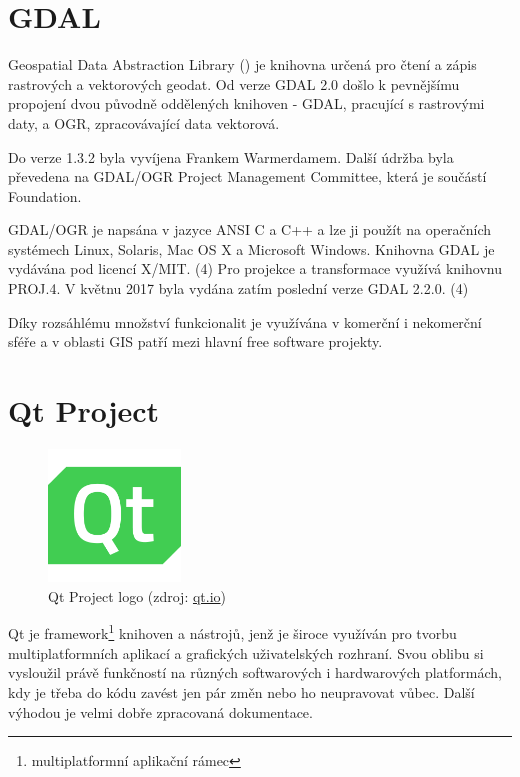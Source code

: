   
\section{GDAL}  

Geospatial Data Abstraction Library () je knihovna určená pro čtení a zápis rastrových a vektorových geodat. Od verze GDAL 2.0 došlo k pevnějšímu propojení dvou původně oddělených knihoven - GDAL, pracující s rastrovými daty, a OGR, zpracovávající data vektorová.

Do verze 1.3.2 byla vyvíjena Frankem Warmerdamem. Další údržba byla převedena na GDAL/OGR Project Management Committee, která je součástí  Foundation. 

GDAL/OGR je napsána v jazyce ANSI C a C++ a lze ji použít na operačních systémech Linux, Solaris, Mac OS X a Microsoft Windows. Knihovna GDAL je vydávána pod licencí X/MIT. (4) Pro projekce a transformace využívá knihovnu PROJ.4. V květnu 2017 byla vydána zatím poslední verze GDAL 2.2.0. (4)

Díky rozsáhlému množství funkcionalit je využívána v komerční i nekomerční sféře a v oblasti GIS patří mezi hlavní free software projekty.


\section{Qt Project}

\begin{figure}[H]
    \centering
      \includegraphics[width=100pt]{./pictures/qt_logo_green_256x256px.png}
      \caption[Qt Project logo]{Qt Project logo 
      (zdroj: \href{http://brand.qt.io/downloads/}{qt.io})}
      \label{fig:qt}
  \end{figure}

Qt je framework\footnote{multiplatformní aplikační rámec} knihoven a nástrojů, jenž je široce využíván pro tvorbu multiplatformních aplikací a grafických uživatelských rozhraní. Svou oblibu si vysloužil právě funkčností na různých softwarových i hardwarových platformách, kdy je třeba do kódu zavést jen pár změn nebo ho neupravovat vůbec. Další výhodou je velmi dobře zpracovaná dokumentace.

